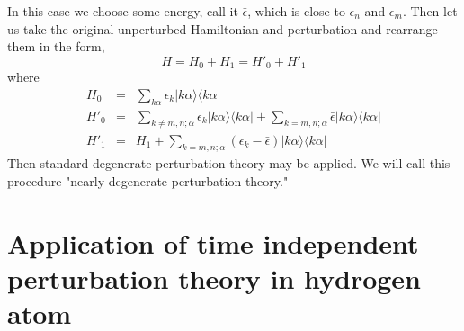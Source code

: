 In this case we choose some energy, call it $\bar{\epsilon}$, which is close to $\epsilon_n$ and $\epsilon_m$. Then let us take the original unperturbed Hamiltonian and perturbation and rearrange them in the form,
\[H = H_0 + H_1 = H'_0 + H'_1\]
where
\begin{eqnarray}
H_0 &=& \sum_{k\alpha} \epsilon_k |k\alpha\rangle\langle k\alpha| \nonumber \\
H'_0 &=& \sum_{k\neq m,n; \alpha} \epsilon_k |k\alpha\rangle\langle k\alpha| + \sum_{k= m,n; \alpha} \bar{\epsilon} |k\alpha\rangle\langle k\alpha| \nonumber \\
H'_1 &=& H_1 + \sum_{k= m,n; \alpha} (\epsilon_k - \bar{\epsilon} )|k\alpha\rangle\langle k\alpha| \nonumber
\end{eqnarray}
Then standard degenerate perturbation theory may be applied.
We will call this procedure "nearly degenerate perturbation theory."

\section{Application of time independent perturbation theory in hydrogen atom}
